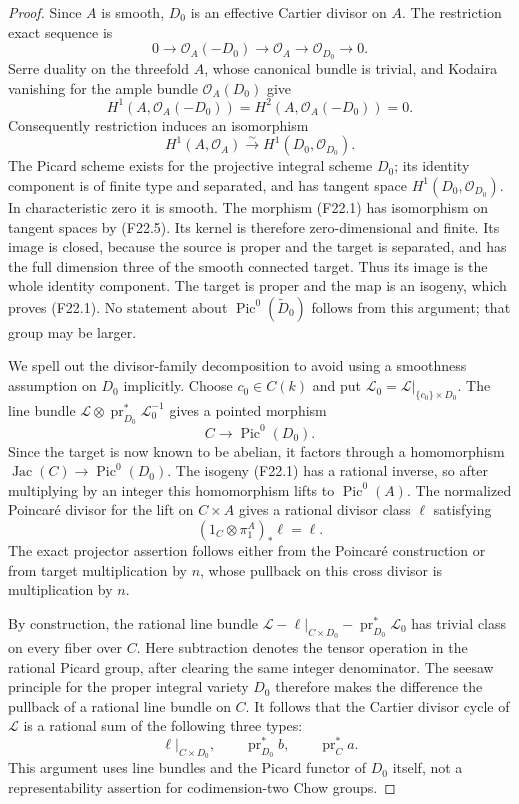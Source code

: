\documentclass[11pt]{article}
\theoremstyle{remark}\newtheorem{remark}[theorem]{Remark}
\begin{document}
\begin{proof}
Since $A$ is smooth, $D_0$ is an effective
Cartier divisor on $A$.  The restriction exact
sequence is
\[
 0\longrightarrow\mathcal O_A(-D_0)
  \longrightarrow\mathcal O_A
  \longrightarrow\mathcal O_{D_0}\longrightarrow0.
 \tag{F22.3}
\]
Serre duality on the threefold $A$, whose
canonical bundle is trivial, and Kodaira
vanishing for the ample bundle
$\mathcal O_A(D_0)$ give
\[
 H^1(A,\mathcal O_A(-D_0))=
 H^2(A,\mathcal O_A(-D_0))=0.
 \tag{F22.4}
\]
Consequently restriction induces an isomorphism
\[
                  H^1(A,\mathcal O_A)
                    \xrightarrow{\sim}H^1(D_0,\mathcal O_{D_0}).
 \tag{F22.5}
\]
The Picard scheme exists for the projective
integral scheme $D_0$; its identity component
is of finite type and separated, and has
tangent space $H^1(D_0,\mathcal O_{D_0})$.
In characteristic zero it is smooth.
The morphism (F22.1) has isomorphism on
tangent spaces by (F22.5).  Its kernel is
therefore zero-dimensional and finite.  Its
image is closed, because the source is proper
and the target is separated, and has the full
dimension three of the smooth connected target.
Thus its image is the whole identity component.
The target is proper and the map is an isogeny,
which proves (F22.1).  No statement about
$\operatorname{Pic}^0(\widetilde D_0)$ follows
from this argument; that group may be larger.

We spell out the divisor-family decomposition
to avoid using a smoothness assumption on
$D_0$ implicitly.  Choose $c_0\in C(k)$ and
put $\mathcal L_0=\mathcal L|_{\{c_0\}\times D_0}$.
The line bundle
$\mathcal L\otimes\operatorname{pr}_{D_0}^*
\mathcal L_0^{-1}$ gives a pointed morphism
\[
                         C\longrightarrow\operatorname{Pic}^0(D_0).
 \tag{F22.6}
\]
Since the target is now known to be abelian,
it factors through a homomorphism
$\operatorname{Jac}(C)\to\operatorname{Pic}^0(D_0)$.
The isogeny (F22.1) has a rational inverse,
so after multiplying by an integer this
homomorphism lifts to
$\operatorname{Pic}^0(A)$.
The normalized Poincar\'e divisor for the
lift on $C\times A$ gives a rational divisor
class $\ell$ satisfying
\[
                         (1_C\otimes\pi_1^A)_*\ell=\ell.
 \tag{F22.7}
\]
The exact projector assertion follows either
from the Poincar\'e construction or from
target multiplication by $n$, whose pullback
on this cross divisor is multiplication by $n$.

By construction, the rational line bundle
$\mathcal L-\ell|_{C\times D_0}-
\operatorname{pr}_{D_0}^*\mathcal L_0$ has
trivial class on every fiber over $C$.
Here subtraction denotes the tensor operation
in the rational Picard group, after clearing
the same integer denominator.
The seesaw principle for the proper integral
variety $D_0$ therefore makes the difference
the pullback of a rational line bundle on $C$.
It follows that the Cartier divisor cycle of
$\mathcal L$ is a rational sum of the following
three types:
\[
  \ell|_{C\times D_0},\qquad
  \operatorname{pr}_{D_0}^*b,\qquad
  \operatorname{pr}_C^*a.
 \tag{F22.8}
\]
This argument uses line bundles and the
Picard functor of $D_0$ itself, not a
representability assertion for codimension-two
Chow groups.


\end{proof}
\end{document}
